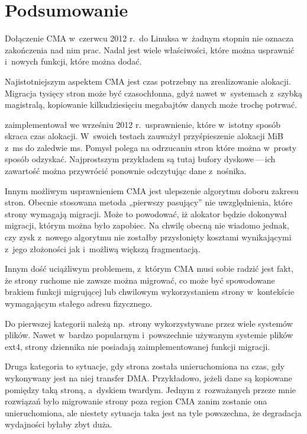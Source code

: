 \section{Podsumowanie}

Dołączenie CMA w~czerwcu 2012 r.\ do Linuksa w~żadnym stopniu nie
oznacza zakończenia nad nim prac.  Nadal jest wiele właściwości, które
można usprawnić i~nowych funkcji, które można dodać.

Najistotniejszym aspektem CMA jest czas potrzebny na zrealizowanie
alokacji.  Migracja tysięcy stron może być czasochłonna, gdyż nawet
w~systemach z~szybką magistralą, kopiowanie kilkudziesięciu megabajtów
danych może trochę potrwać.

\textcite{patch:cma-discard} zaimplementował we wrześniu 2012
r.\ usprawnienie, które w~istotny sposób skraca czas alokacji.
W~swoich testach zauważył przyśpieszenie alokacji \unit[10]{MiB}
z~\unit[146]{ms} do zaledwie \unit[7]{ms}.  Pomysł polega na
odrzucaniu stron które można w~prosty sposób odzyskać.  Najprostszym
przykładem są tutaj bufory dyskowe\,---\,ich zawartość można
przywrócić ponownie odczytując dane z~nośnika.

Innym możliwym usprawnieniem CMA jest ulepszenie algorytmu doboru
zakresu stron.  Obecnie stosowana metoda „pierwszy pasujący” nie
uwzględnienia, które strony wymagają migracji.  Może to powodować, iż
alokator będzie dokonywał migracji, którym można było zapobiec.  Na
chwilę obecną nie wiadomo jednak, czy zysk z~nowego algorytmu nie
zostałby przysłonięty kosztami wynikającymi z~jego złożoności jak
i~możliwą większą fragmentacją.

Innym dość uciążliwym problemem, z~którym CMA musi sobie radzić jest
fakt, że strony ruchome nie zawsze można migrować, co może być
spowodowane brakiem funkcji migrującej lub chwilowym wykorzystaniem
strony w~kontekście wymagającym stałego adresu fizycznego.

Do pierwszej kategorii należą np.\ strony wykorzystywane przez wiele
systemów plików.  Nawet w~bardzo popularnym i~powszechnie używanym
systemie plików ext4, strony dziennika nie posiadają zaimplementowanej
funkcji migracji.

Druga kategoria to sytuacje, gdy strona została unieruchomiona na
czas, gdy wykonywany jest na niej transfer DMA.  Przykładowo, jeżeli
dane są kopiowane pomiędzy taką stroną, a~dyskiem twardym.  Jednym
z~rozważanych przeze mnie rozwiązań było migrowanie strony poza region
CMA zanim zostanie ona unieruchomiona, ale niestety sytuacja taka jest
na tyle powszechna, że degradacja wydajności byłaby zbyt duża.

